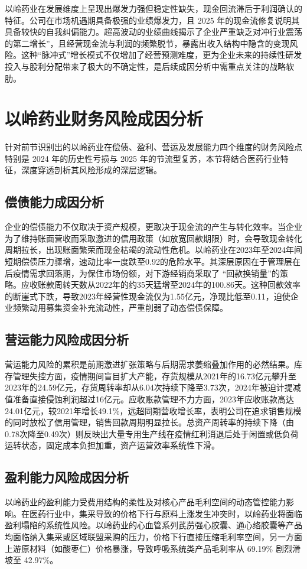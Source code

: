 \documentclass[12pt,a4paper,fontset=windows,UTF8]{ctexart}
\begin{document}
以岭药业在发展维度上呈现出爆发力强但稳定性缺失，现金回流滞后于利润确认的特征。公司在市场机遇期具备极强的业绩爆发力，且 2025 年的现金流修复说明其具备较快的自我纠偏能力。超高波动的业绩曲线揭示了企业严重缺乏对冲行业震荡的第二增长”，且经营现金流与利润的频繁脱节，暴露出收入结构中隐含的变现风险。这种“脉冲式”增长模式不仅增加了经营预测难度，更为企业未来的持续性研发投入与股利分配带来了极大的不确定性，是后续成因分析中需重点关注的战略软肋。

\section{以岭药业财务风险成因分析}
针对前节识别出的以岭药业在偿债、盈利、营运及发展能力四个维度的财务风险点特别是 2024 年的历史性亏损与 2025 年的节流型复苏，本节将结合医药行业特征，深度穿透剖析其风险形成的深层逻辑。

\subsection{偿债能力成因分析}
企业的偿债能力不仅取决于资产规模，更取决于现金流的产生与转化效率。当企业为了维持账面营收而采取激进的信用政策（如放宽回款期限）时，会导致现金转化周期拉长，出现账面繁荣而现金枯竭的流动性危机。以岭药业在2023年至2024年间短期偿债压力骤增，速动比率一度跌至0.92的危险水平。其深层原因在于管理层在后疫情需求回落期，为保住市场份额，对下游经销商采取了 “回款换销量”的策略。应收账款周转天数从2022年的约35天猛增至2024年的100.86天。这种回款效率的断崖式下跌，导致2023年经营性现金流仅为1.55亿元，净现比低至0.11，迫使企业频繁动用募集资金补充流动性，严重削弱了动态偿债保障。

\subsection{营运能力风险成因分析}
营运能力风险的累积是前期激进扩张策略与后期需求萎缩叠加作用的必然结果。库存管理失控方面，疫情期间盲目扩大产能，存货规模从2021年的16.73亿元攀升至2023年的24.59亿元，存货周转率却从6.04次持续下降至3.73次，2024年被迫计提减值准备直接侵蚀利润超过16亿元。应收账款管理不力方面，2023年应收账款高达24.01亿元，较2021年增长49.1\%，远超同期营收增长率，表明公司在追求销售规模的同时放松了信用管理，销售回款周期明显拉长。总资产周转率的持续下降（由0.78次降至0.49次）则反映出大量专用生产线在疫情红利消退后处于闲置或低负荷运转状态，固定成本负担加重，资产运营效率系统性下滑。

\subsection{盈利能力风险成因分析}
以岭药业的盈利能力受费用结构的柔性及对核心产品毛利空间的动态管控能力影响。在医药行业中，集采导致的价格下行与原料上涨发生冲突时，以岭药业将面临盈利塌陷的系统性风险。以岭药业的心血管系列芪苈强心胶囊、通心络胶囊等产品均面临纳入集采或区域联盟采购的压力，价格下行直接压缩毛利率空间，另一方面上游原材料（如酸枣仁）价格暴涨，导致呼吸系统类产品毛利率从 69.19\% 剧烈滑坡至 42.97\%。
\end{document}
